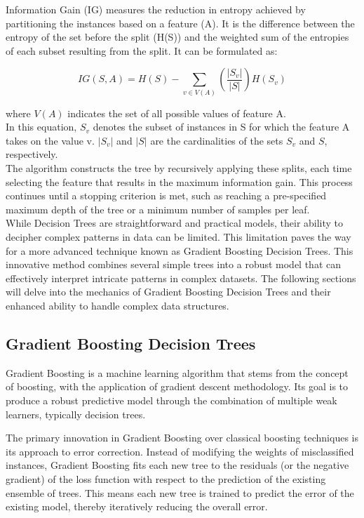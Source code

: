 Information Gain (IG) measures the reduction in entropy achieved by partitioning the instances based on a feature (A). It is the difference between the entropy of the set before the split (H(S)) and the weighted sum of the entropies of each subset resulting from the split. It can be formulated as:

\begin{equation}
	IG(S, A) = H(S) - \sum_{v \in V(A)} \left(\frac{|S_v|}{|S|}\right) H(S_v)
\end{equation}

where $V(A)$ indicates the set of all possible values of feature A.\\
In this equation, $S_v$ denotes the subset of instances in S for which the feature A takes on the value v. $|S_v|$ and $|S|$ are the cardinalities of the sets $S_v$ and $S$, respectively.\\

The algorithm constructs the tree by recursively applying these splits, each time selecting the feature that results in the maximum information gain. This process continues until a stopping criterion is met, such as reaching a pre-specified maximum depth of the tree or a minimum number of samples per leaf.\\


While Decision Trees are straightforward and practical models, their ability to decipher complex patterns in data can be limited. This limitation paves the way for a more advanced technique known as Gradient Boosting Decision Trees. This innovative method combines several simple trees into a robust model that can effectively interpret intricate patterns in complex datasets. The following sections will delve into the mechanics of Gradient Boosting Decision Trees and their enhanced ability to handle complex data structures.

\subsection{Gradient Boosting Decision Trees}

Gradient Boosting is a machine learning algorithm that stems from the concept of boosting, with the application of gradient descent methodology. Its goal is to produce a robust predictive model through the combination of multiple weak learners, typically decision trees.

The primary innovation in Gradient Boosting over classical boosting techniques is its approach to error correction. Instead of modifying the weights of misclassified instances, Gradient Boosting fits each new tree to the residuals (or the negative gradient) of the loss function with respect to the prediction of the existing ensemble of trees. This means each new tree is trained to predict the error of the existing model, thereby iteratively reducing the overall error.

